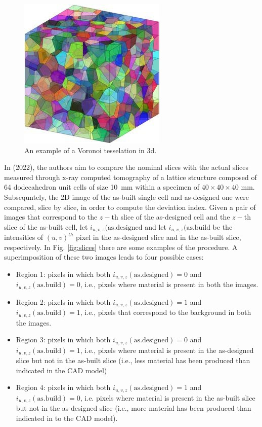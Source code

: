 \begin{figure}[H]
    \centering
    \includegraphics[scale=0.43]{Images/3D-Voronoi-tessellation-with-1000-grains-unit-cell-with-its-internal-grains-not.png}
    \caption[3d Voronoi tessellation.]{An example of a Voronoi tesselation in 3d.}
    \label{fig:3dvoronoi}
\end{figure}

In \citeauthor{colosimo_complex_2022} (2022), the authors aim to compare the nominal slices with the actual slices measured through x-ray computed tomography of a lattice structure composed of 64 dodecahedron unit cells of size \SI{10}{\milli\metre} within a specimen of $40 \times 40 \times 40$ \unit{\milli\metre}. Subsequntely, the 2D image of the as-built single cell and as-designed one were compared, slice by slice, in order to compute the deviation index. Given a pair of images that correspond to the $z-$th slice of the as-designed cell and the $z-$th slice of the as-built cell, let $i_{u,v,z}(\text{as.designed}$ and let $i_{u,v,z}(\text{as.build}$ be the intensities of $(u,v)^{th}$ pixel in the as-designed slice and in the as-built slice, respectively. In Fig. \ref{fig:slices} there are some examples of the procedure. A superimposition of these two images leads to four possible cases:
\begin{itemize}
    \item Region 1: pixels in which both $i_{u,v,z}(\text{as.designed})=0$ and $i_{u,v,z}(\text{as.build})=0$, i.e., pixels where material is present in both the images.
    \item Region 2: pixels in which both $i_{u,v,z}(\text{as.designed})=1$ and $i_{u,v,z}(\text{as.build})=1$, i.e., pixels that correspond to the background in both the images.
    \item Region 3: pixels in which both $i_{u,v,z}(\text{as.designed})=0$ and $i_{u,v,z}(\text{as.build})=1$, i.e., pixels where material is present in the as-designed slice but not in the as-built slice (i.e., less material has been produced than indicated in the CAD model)
    \item Region 4: pixels in which both $i_{u,v,z}(\text{as.designed})=1$ and $i_{u,v,z}(\text{as.build})=0$, i.e. pixels where material is present in the as-built slice but not in the as-designed slice (i.e., more material has been produced than indicated in to the CAD model).
\end{itemize}


